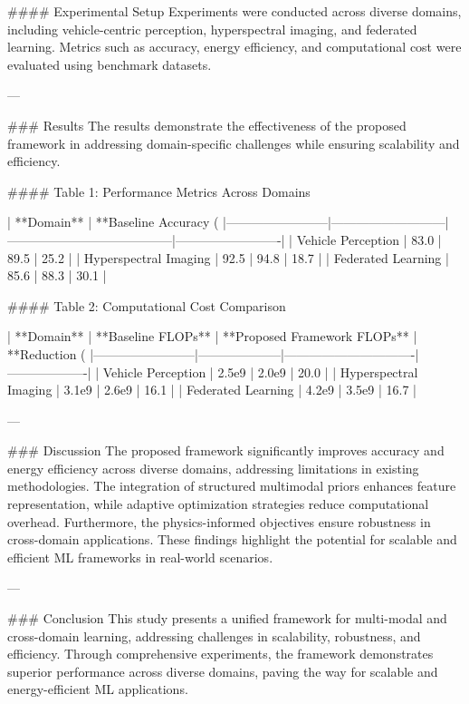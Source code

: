 #### Experimental Setup  
Experiments were conducted across diverse domains, including vehicle-centric perception, hyperspectral imaging, and federated learning. Metrics such as accuracy, energy efficiency, and computational cost were evaluated using benchmark datasets.

---

### Results  
The results demonstrate the effectiveness of the proposed framework in addressing domain-specific challenges while ensuring scalability and efficiency.

#### Table 1: Performance Metrics Across Domains  

| **Domain**            | **Baseline Accuracy (%
|------------------------|---------------------------|---------------------------------------|-------------------------|  
| Vehicle Perception     | 83.0                     | 89.5                                 | 25.2                   |  
| Hyperspectral Imaging  | 92.5                     | 94.8                                 | 18.7                   |  
| Federated Learning     | 85.6                     | 88.3                                 | 30.1                   |  

#### Table 2: Computational Cost Comparison  

| **Domain**            | **Baseline FLOPs** | **Proposed Framework FLOPs** | **Reduction (%
|------------------------|--------------------|-------------------------------|-------------------|  
| Vehicle Perception     | 2.5e9             | 2.0e9                         | 20.0              |  
| Hyperspectral Imaging  | 3.1e9             | 2.6e9                         | 16.1              |  
| Federated Learning     | 4.2e9             | 3.5e9                         | 16.7              |  

---

### Discussion  
The proposed framework significantly improves accuracy and energy efficiency across diverse domains, addressing limitations in existing methodologies. The integration of structured multimodal priors enhances feature representation, while adaptive optimization strategies reduce computational overhead. Furthermore, the physics-informed objectives ensure robustness in cross-domain applications. These findings highlight the potential for scalable and efficient ML frameworks in real-world scenarios.

---

### Conclusion  
This study presents a unified framework for multi-modal and cross-domain learning, addressing challenges in scalability, robustness, and efficiency. Through comprehensive experiments, the framework demonstrates superior performance across diverse domains, paving the way for scalable and energy-efficient ML applications.

